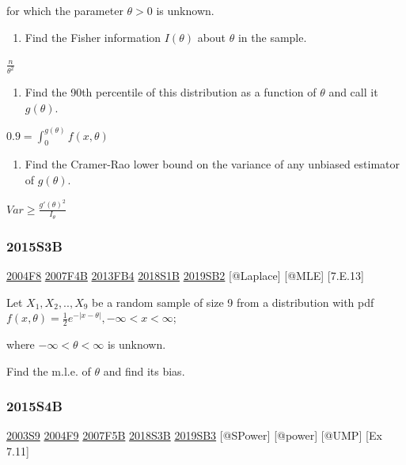 \documentclass[6pt,twocolumn,Portrait]{article}
\providecommand{\tightlist}{%
  \setlength{\itemsep}{0pt}\setlength{\parskip}{0pt}}
\begin{document}
for which the parameter \(\theta>0\) is unknown.

\begin{enumerate}
\def\labelenumi{(\alph{enumi})}
\tightlist
\item
  Find the Fisher information \(I(\theta)\) about \(\theta\) in the
  sample.
\end{enumerate}

\(\frac{n}{\theta^2}\)

\begin{enumerate}
\def\labelenumi{(\alph{enumi})}
\setcounter{enumi}{1}
\tightlist
\item
  Find the 90th percentile of this distribution as a function of
  \(\theta\) and call it \(g(\theta)\).
\end{enumerate}

\(0.9=\int_0^{g(\theta)}f(x,\theta)\)

\begin{enumerate}
\def\labelenumi{(\alph{enumi})}
\setcounter{enumi}{2}
\tightlist
\item
  Find the Cramer-Rao lower bound on the variance of any unbiased
  estimator of \(g(\theta)\).
\end{enumerate}

\(Var\ge\frac{g'(\theta)^2}{I_{\theta}}\)

\hypertarget{s3b-1}{%
\subsubsection{2015S3B}\label{s3b-1}}

\protect\hyperlink{f8-2}{2004F8} \protect\hyperlink{f4b}{2007F4B}
\protect\hyperlink{fb4-2}{2013FB4} \protect\hyperlink{s1b-2}{2018S1B}
\protect\hyperlink{sb2-3}{2019SB2} {[}@Laplace{]} {[}@MLE{]}
{[}7.E.13{]}\protect\hyperlink{section}{}

Let \(X_1,X_2,..,X_9\) be a random sample of size 9 from a distribution
with pdf \(f(x,\theta) =\frac12e^{-|x-\theta|}, -\infty<x<\infty\);

where \(-\infty<\theta<\infty\) is unknown.

Find the m.l.e. of \(\theta\) and find its bias.

\hypertarget{s4b-1}{%
\subsubsection{2015S4B}\label{s4b-1}}

\protect\hyperlink{s9}{2003S9} \protect\hyperlink{f9-2}{2004F9}
\protect\hyperlink{f5b}{2007F5B} \protect\hyperlink{s3b-2}{2018S3B}
\protect\hyperlink{sb3-3}{2019SB3} {[}@SPower{]} {[}@power{]} {[}@UMP{]}
{[}Ex 7.11{]}
\end{document}
